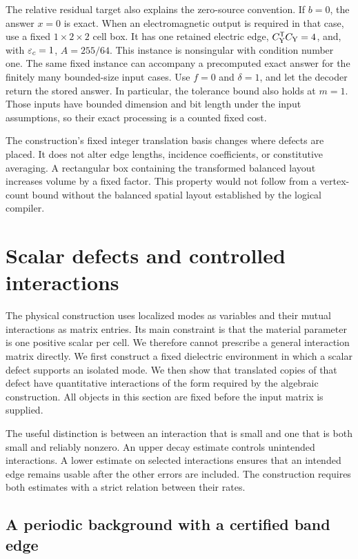 The relative residual target also explains the zero-source convention. If $b=0$, the answer $x=0$ is exact. When an electromagnetic output is required in that case, use a fixed $1\times2\times2$ cell box. It has one retained electric edge, $C_{\rm Y}^{\mathsf T}C_{\rm Y}=4$, and, with $\varepsilon_c=1$, $A=255/64$. This instance is nonsingular with condition number one. The same fixed instance can accompany a precomputed exact answer for the finitely many bounded-size input cases. Use $f=0$ and $\delta=1$, and let the decoder return the stored answer. In particular, the tolerance bound also holds at $m=1$. Those inputs have bounded dimension and bit length under the input assumptions, so their exact processing is a counted fixed cost.

The construction's fixed integer translation basis changes where defects are placed. It does not alter edge lengths, incidence coefficients, or constitutive averaging. A rectangular box containing the transformed balanced layout increases volume by a fixed factor. This property would not follow from a vertex-count bound without the balanced spatial layout established by the logical compiler.

\section{Scalar defects and controlled interactions}
\label{d:sec:physical}

The physical construction uses localized modes as variables and their mutual
interactions as matrix entries. Its main constraint is that the material
parameter is one positive scalar per cell. We therefore cannot prescribe a
general interaction matrix directly. We first construct a fixed dielectric
environment in which a scalar defect supports an isolated mode. We then show
that translated copies of that defect have quantitative interactions of the
form required by the algebraic construction. All objects in this section are
fixed before the input matrix is supplied.

The useful distinction is between an interaction that is small and one that
is both small and reliably nonzero. An upper decay estimate controls
unintended interactions. A lower estimate on selected interactions ensures
that an intended edge remains usable after the other errors are included.
The construction requires both estimates with a strict relation between
their rates.

\subsection{A periodic background with a certified band edge}

